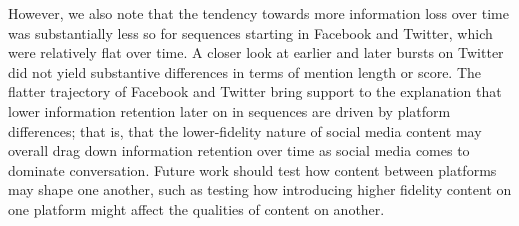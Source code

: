 \documentclass[letterpaper]{article} %
\begin{document}
However, we also note that the tendency towards more information loss over time was substantially less so for sequences starting in Facebook and Twitter, which were relatively flat over time. A closer look at earlier and later bursts on Twitter did not yield substantive differences in terms of mention length or score. The flatter trajectory of Facebook and Twitter bring support to the explanation that lower information retention later on in sequences are driven by platform differences; that is, that the lower-fidelity nature of social media content may overall drag down information retention over time as social media comes to dominate conversation. Future work should test how content between platforms may shape one another, such as testing how introducing higher fidelity content on one platform might affect the qualities of content on another.

\end{document}

